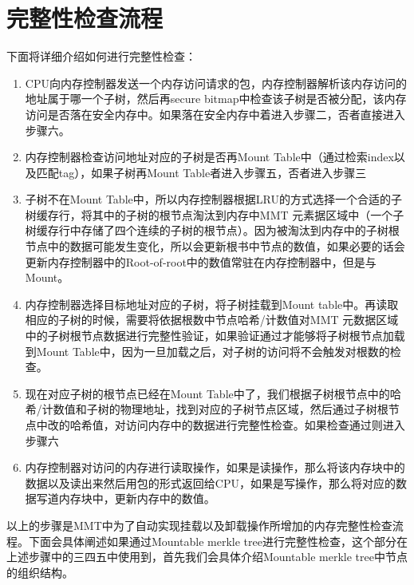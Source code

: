 \section{完整性检查流程}
下面将详细介绍如何进行完整性检查：
\begin{enumerate}
    \item CPU向内存控制器发送一个内存访问请求的包，内存控制器解析该内存访问的地址属于哪一个子树，然后再secure bitmap中检查该子树是否被分配，该内存访问是否落在安全内存中。如果落在安全内存中着进入步骤二，否者直接进入步骤六。
    \item 内存控制器检查访问地址对应的子树是否再Mount Table中（通过检索index以及匹配tag），如果子树再Mount Table者进入步骤五，否者进入步骤三
    \item 子树不在Mount Table中，所以内存控制器根据LRU的方式选择一个合适的子树缓存行，将其中的子树的根节点淘汰到内存中MMT 元素据区域中（一个子树缓存行中存储了四个连续的子树的根节点）。因为被淘汰到内存中的子树根节点中的数据可能发生变化，所以会更新根书中节点的数值，如果必要的话会更新内存控制器中的Root-of-root中的数值常驻在内存控制器中，但是与Mount。
    \item 内存控制器选择目标地址对应的子树，将子树挂载到Mount table中。再读取相应的子树的时候，需要将依据根数中节点哈希/计数值对MMT 元数据区域中的子树根节点数据进行完整性验证，如果验证通过才能够将子树根节点加载到Mount Table中，因为一旦加载之后，对子树的访问将不会触发对根数的检查。
    \item 现在对应子树的根节点已经在Mount Table中了，我们根据子树根节点中的哈希/计数值和子树的物理地址，找到对应的子树节点区域，然后通过子树根节点中改的哈希值，对访问内存中的数据进行完整性检查。如果检查通过则进入步骤六
    \item 内存控制器对访问的内存进行读取操作，如果是读操作，那么将该内存块中的数据以及读出来然后用包的形式返回给CPU，如果是写操作，那么将对应的数据写道内存块中，更新内存中的数值。
\end{enumerate}
以上的步骤是MMT中为了自动实现挂载以及卸载操作所增加的内存完整性检查流程。下面会具体阐述如果通过Mountable merkle tree进行完整性检查，这个部分在上述步骤中的三四五中使用到，首先我们会具体介绍Mountable merkle tree中节点的组织结构。

